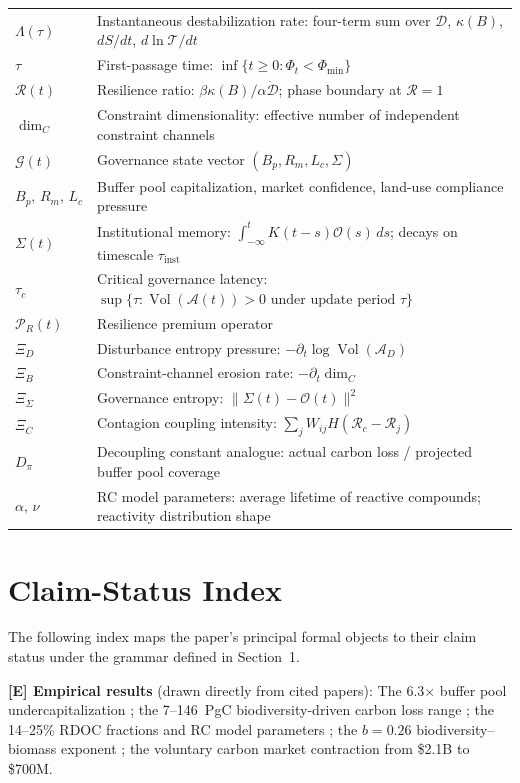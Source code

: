 \documentclass[12pt]{article}
\newcommand{\Acal}{\mathcal{A}}
\newcommand{\Gcal}{\mathcal{G}}
\newcommand{\Tcal}{\mathcal{T}}
\newcommand{\vol}{\operatorname{Vol}}
\begin{document}
\begin{longtable}{@{}p{2.6cm}p{9.6cm}@{}}
$\Lambda(\tau)$ & Instantaneous destabilization rate: four-term sum over $\mathcal{D}$, $\kappa(B)$, $dS/dt$, $d\ln\Tcal/dt$ \\[2pt]
$\tau$ & First-passage time: $\inf\{t\geq 0:\Phi_t<\Phi_\text{min}\}$ \\[2pt]
$\mathcal{R}(t)$ & Resilience ratio: $\beta\kappa(B)/\alpha\dot{\mathcal{D}}$; phase boundary at $\mathcal{R}=1$ \\[2pt]
$\dim_C$ & Constraint dimensionality: effective number of independent constraint channels \\[2pt]
$\Gcal(t)$ & Governance state vector $(B_p,R_m,L_c,\Sigma)$ \\[2pt]
$B_p,\,R_m,\,L_c$ & Buffer pool capitalization, market confidence, land-use compliance pressure \\[2pt]
$\Sigma(t)$ & Institutional memory: $\int_{-\infty}^t K(t-s)\mathcal{O}(s)\,ds$; decays on timescale $\tau_\text{inst}$ \\[2pt]
$\tau_c$ & Critical governance latency: $\sup\{\tau:\vol(\Acal(t))>0\text{ under update period }\tau\}$ \\[2pt]
$\mathcal{P}_R(t)$ & Resilience premium operator \\[2pt]
$\Xi_D$ & Disturbance entropy pressure: $-\partial_t\log\vol(\Acal_D)$ \\[2pt]
$\Xi_B$ & Constraint-channel erosion rate: $-\partial_t\dim_C$ \\[2pt]
$\Xi_\Sigma$ & Governance entropy: $\|\Sigma(t)-\mathcal{O}(t)\|^2$ \\[2pt]
$\Xi_C$ & Contagion coupling intensity: $\sum_j W_{ij}H(\mathcal{R}_c-\mathcal{R}_j)$ \\[2pt]
$D_\pi$ & Decoupling constant analogue: actual carbon loss / projected buffer pool coverage \\[2pt]
$\alpha,\,\nu$ & RC model parameters: average lifetime of reactive compounds; reactivity distribution shape \\
\end{longtable}
\endgroup

\section{Claim-Status Index}
\label{app:claims}

The following index maps the paper's principal formal objects to their claim status
under the grammar defined in Section~1.

\medskip
\noindent\textbf{[E] Empirical results} (drawn directly from cited papers):
The 6.3$\times$ buffer pool undercapitalization \citep{Wu2026};
the 7--146~PgC biodiversity-driven carbon loss range \citep{Weiskopf2024};
the 14--25\% RDOC fractions and RC model parameters \citep{Watanabe2026};
the $b=0.26$ biodiversity--biomass exponent \citep{OConnor2017};
the voluntary carbon market contraction from \$2.1B to \$700M.
\end{document}
